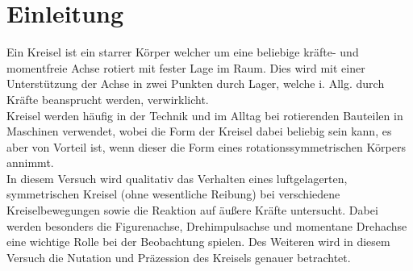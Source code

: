 


\chapter{Einleitung}

Ein Kreisel ist ein starrer Körper welcher um eine beliebige kräfte- und momentfreie Achse rotiert mit fester Lage im Raum. Dies wird mit einer Unterstützung der Achse in zwei Punkten durch Lager, welche i. Allg. durch Kräfte beansprucht werden, verwirklicht. \\
Kreisel werden häufig in der Technik und im Alltag bei rotierenden Bauteilen in Maschinen verwendet, wobei die Form der Kreisel dabei beliebig sein kann, es aber von Vorteil ist, wenn dieser die Form eines rotationssymmetrischen Körpers annimmt.
\newline\\
In diesem Versuch wird qualitativ das Verhalten eines luftgelagerten, symmetrischen Kreisel (ohne wesentliche Reibung) bei verschiedene Kreiselbewegungen sowie die Reaktion auf äußere Kräfte untersucht. Dabei werden besonders die Figurenachse, Drehimpulsachse und momentane Drehachse eine wichtige Rolle bei der Beobachtung spielen. Des Weiteren wird in diesem Versuch die Nutation und Präzession des Kreisels genauer betrachtet.